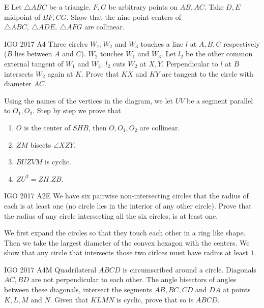

\prob{}
{}{E}{
    Let $\triangle ABC$ be a triangle. $F, G$ be arbitrary points on $AB, AC$.
    Take $D, E$ midpoint of $BF, CG$. Show that the nine-point centers of
    $\triangle ABC,\ \triangle ADE,\ \triangle AFG$ are collinear.
}\label{eriq_lemma_3}


{IGO 2017 A4}{}{
    Three circles $W_1 , W_2$ and $W_3$  touches a line $l$ at
    $A ,B ,C$  respectively ($B$ lies between $A$ and $C$). $W_2$ touches  $W_1$
    and $W_3$. Let $l_2$ be the other common external tangent of  $W_1$ and $W_3$.
    $l_2$ cuts $W_2$ at $X ,Y$. Perpendicular to $l$ at $B$ intersects $W_2$ again
    at $K$. Prove that $KX$ and $KY$ are tangent to the circle with diameter
    $AC$.
}


\begin{solution}
    Using the names of the vertices in the diagram, we let $UV$ be a segment
    parallel to $O_1, O_2$. Step by step we prove that
    \begin{enumerate}
        \item $O$ is the center of $SHB$, then $O, O_1, O_2$ are collinear.
        \item $ZM$ bisects $\angle XZY$. 
        \item $BUZVM$ is cyclic.
        \item $ZU^2 = ZH.ZB$.
    \end{enumerate}
\end{solution}



{IGO 2017 A2}{E}{
    We have six pairwise non-intersecting circles that the radius of each is
    at least one (no circle lies in the interior of any other circle). Prove
    that the radius of any circle intersecting all the six circles, is at least one.
}

\begin{solution}
    We first expand the circles so that they touch each other in a ring like
    shape. Then we take the largest diameter of the convex hexagon with the
    centers. We show that any circle that intersects those two cirlces must
    have radius at least $1$.
\end{solution}

{IGO 2017 A4}{M}{
    Quadrilateral $ABCD$ is circumscribed around a circle. Diagonals $AC,BD$
    are not perpendicular to each other. The angle bisectors of angles between
    these diagonals, intersect the segments $AB,BC,CD$ and $DA$ at points
    $K,L,M$ and $N$. Given that $KLMN$ is cyclic, prove that so is $ABCD$.
}

